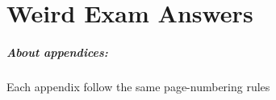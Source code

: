 \chapter{Weird Exam Answers}	%

\paragraph{About appendices:}
	Each appendix follow the same page-numbering rules



